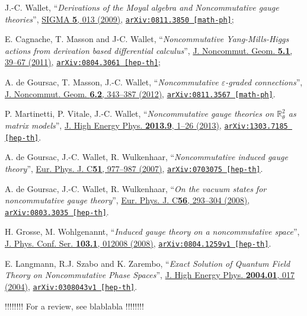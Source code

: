 \documentclass[a4paper,11pt,twoside]{article}
\numberwithin{equation}{section}
\newcommand{\arxiv}[3]{\href{#3}{\texttt{arXiv:#1 [#2]}}}
\theoremstyle{nonumberplain}
\newcounter{and}
\begin{document}
\begin{thebibliography}{88}
%
J.-C. Wallet, %
``\emph{Derivations of the Moyal algebra and Noncommutative gauge theories}'', %
\href{http://dx.doi.org/10.3842/SIGMA.2009.013}{SIGMA \textbf{5}, 013 (2009)}, %
\arxiv{0811.3850}{math-ph}{http://arxiv.org/abs/arXiv:0811.3850};\par%
E. Cagnache, T. Masson and J-C. Wallet, %
``\emph{Noncommutative Yang-Mills-Higgs actions from derivation based differential calculus}'', %
\href{http://dx.doi.org/10.4171/JNCG/69}{J. Noncommut. Geom. \textbf{5.1}, 39--67 (2011)}, %
\arxiv{0804.3061}{hep-th}{http://arxiv.org/abs/arXiv:0804.3061};\par%
A. de Goursac, T. Masson, J.-C. Wallet, %
``\emph{Noncommutative $\varepsilon$-graded connections}'', %
\href{http://dx.doi.org/10.4171/JNCG/94}{J. Noncommut. Geom. \textbf{6.2}, 343--387 (2012)}, %
\arxiv{0811.3567}{math-ph}{http://arxiv.org/abs/arXiv:0811.3567}.%

%
P. Martinetti, P. Vitale, J.-C. Wallet, %
``\emph{Noncommutative gauge theories on $\mathbb{R}^2_\theta$ as matrix models}'', %
\href{http://dx.doi.org/10.1007/JHEP09(2013)051}{J. High Energy Phys. \textbf{2013.9}, 1--26 (2013)}, %
\arxiv{1303.7185}{hep-th}{http://arxiv.org/abs/1303.7185}.%

%
A. de Goursac, J.-C. Wallet, R. Wulkenhaar, %
``\emph{Noncommutative induced gauge theory}'', %
\href{http://dx.doi.org/10.1140/epjc/s10052-007-0335-2}{Eur. Phys. J. C\textbf{51}, 977--987 (2007)}, %
\arxiv{0703075}{hep-th}{http://arxiv.org/abs/hep-th/0703075}.%

%
A. de Goursac, J.-C. Wallet, R. Wulkenhaar, %
``\emph{On the vacuum states for noncommutative gauge theory}'', %
\href{http://dx.doi.org/10.1140/epjc/s10052-008-0652-0}{Eur. Phys. J. C\textbf{56}, 293--304 (2008)}, %
\arxiv{0803.3035}{hep-th}{http://arxiv.org/abs/arXiv:0803.3035}.%

%
H. Grosse, M. Wohlgenannt, %
``\emph{Induced gauge theory on a noncommutative space}'', %
\href{http://dx.doi.org/10.1088/1742-6596/103/1/012008}{J. Phys. Conf. Ser. \textbf{103.1}, 012008 (2008)}, %
\arxiv{0804.1259v1}{hep-th}{http://arxiv.org/abs/0804.1259v1}.%

%
E. Langmann, R.J. Szabo and K. Zarembo, %
``\emph{Exact Solution of Quantum Field Theory on Noncommutative Phase Spaces}'', %
\href{http://dx.doi.org/10.1088/1126-6708/2004/01/017}{J. High Energy Phys. \textbf{2004.01}, 017 (2004)}, %
\arxiv{0308043v1}{hep-th}{http://arxiv.org/abs/hep-th/0308043v1}.%

%
!!!!!!!! For a review, see blablabla !!!!!!!!%

\end{thebibliography}

\end{document}
